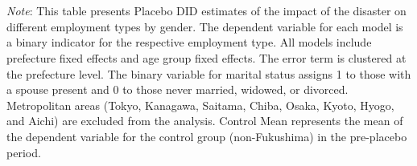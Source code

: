 \documentclass[serif, aspectratio=169]{beamer}
\begin{document}
\begin{frame}[label=different_types_placebo]
\begin{table}[htbp]
\\\\{\linewidth}{\tiny \textit{Note}: This table presents Placebo DID estimates of the impact of the disaster on different employment types by gender. The dependent variable for each model is a binary indicator for the respective employment type. All models include prefecture fixed effects and age group fixed effects. The error term is clustered at the prefecture level. The binary variable for marital status assigns 1 to those with a spouse present and 0 to those never married, widowed, or divorced. Metropolitan areas (Tokyo, Kanagawa, Saitama, Chiba, Osaka, Kyoto, Hyogo, and Aichi) are excluded from the analysis. Control Mean represents the mean of the dependent variable for the control group (non-Fukushima) in the pre-placebo period.}
\end{table}

\end{frame}
\end{document}
